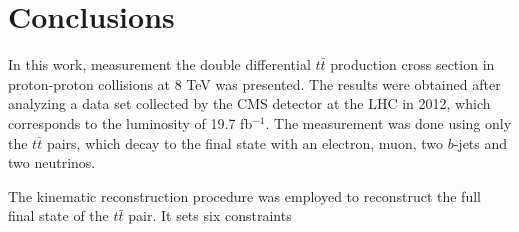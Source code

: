 \chapter{Conclusions}

In this work, measurement the double differential $t\bar{t}$ production cross section in proton-proton collisions at 8 TeV was presented.
The results were obtained after analyzing a data set collected by the CMS detector at the LHC in 2012, which corresponds to the 
luminosity of 19.7 fb$^{-1}$. The measurement was done using only the $t\bar{t}$ pairs, which decay to the final state with an
electron, muon, two $b$-jets and two neutrinos.

The kinematic reconstruction procedure was employed to reconstruct the full final state of the $t\bar{t}$ pair. It sets six constraints 

